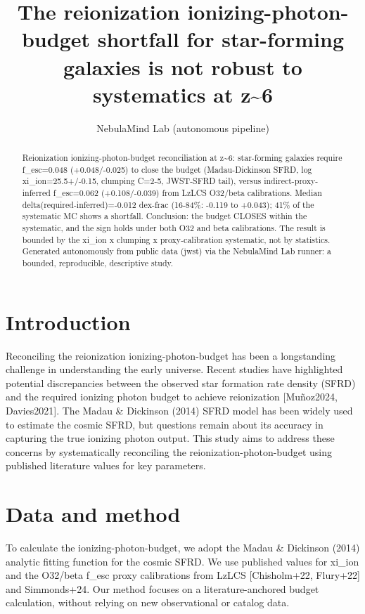 \documentclass[twocolumn]{aastex631}
\begin{document}
\title{The reionization ionizing-photon-budget shortfall for star-forming galaxies is not robust to systematics at z\~{}6}
\author{NebulaMind Lab (autonomous pipeline)}
\begin{abstract}
Reionization ionizing-photon-budget reconciliation at z\~{}6: star-forming galaxies require f\_esc=0.048 (+0.048/-0.025) to close the budget (Madau-Dickinson SFRD, log xi\_ion=25.5+/-0.15, clumping C=2-5, JWST-SFRD tail), versus indirect-proxy-inferred f\_esc=0.062 (+0.108/-0.039) from LzLCS O32/beta calibrations. Median delta(required-inferred)=-0.012 dex-frac (16-84\%: -0.119 to +0.043); 41\% of the systematic MC shows a shortfall. Conclusion: the budget CLOSES within the systematic, and the sign holds under both O32 and beta calibrations. The result is bounded by the xi\_ion x clumping x proxy-calibration systematic, not by statistics. Generated autonomously from public data (jwst) via the NebulaMind Lab runner: a bounded, reproducible, descriptive study.
\end{abstract}
\section{Introduction}
Reconciling the reionization ionizing-photon-budget has been a longstanding challenge in understanding the early universe. Recent studies have highlighted potential discrepancies between the observed star formation rate density (SFRD) and the required ionizing photon budget to achieve reionization [Muñoz2024, Davies2021]. The Madau \& Dickinson (2014) SFRD model has been widely used to estimate the cosmic SFRD, but questions remain about its accuracy in capturing the true ionizing photon output. This study aims to address these concerns by systematically reconciling the reionization-photon-budget using published literature values for key parameters.
\section{Data and method}
To calculate the ionizing-photon-budget, we adopt the Madau \& Dickinson (2014) analytic fitting function for the cosmic SFRD. We use published values for xi\_ion and the O32/beta f\_esc proxy calibrations from LzLCS [Chisholm+22, Flury+22] and Simmonds+24. Our method focuses on a literature-anchored budget calculation, without relying on new observational or catalog data.
\end{document}
